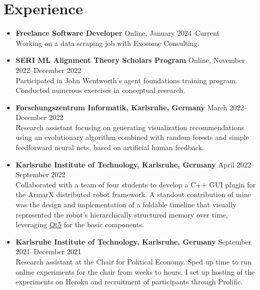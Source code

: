 \documentclass[letterpaper,9pt]{article}
\begin{document}
\section{Experience}
\begin{itemize}
	\item \textbf{Freelance Software Developer} \hfill Online, January 2024--Current \\
        Working on a data scraping job with Exosome Consulting.
	\item \textbf{SERI ML Alignment Theory Scholars Program} \hfill Online, November 2022--December 2022 \\
	      Participated in John Wentworth's agent foundations training program. Conducted numerous exercises in conceptual research.
	\item \textbf{Forschungszentrum Informatik, Karlsruhe, Germany} \hfill March 2022--December 2022 \\
	      Research assistant focusing on generating visualization recommendations using an
	      evolutionary algorithm combined with random forests and simple feedforward neural nets,
	      based on artificial human feedback.
	\item \textbf{Karlsruhe Institute of Technology, Karlsruhe, Germany} \hfill April 2022--September 2022 \\
	      Collaborated with a team of four students to develop a C++ GUI plugin for the
	      ArmarX distributed robot framework. A standout contribution of mine was the
	      design and implementation of a foldable timeline that visually represented the
	      robot's hierarchically structured memory over time,
	      leveraging \href{https://doc.qt.io/qt-5/}{Qt5} for the basic components.
	\item \textbf{Karlsruhe Institute of Technology, Karlsruhe, Germany} \hfill September 2021--December 2021 \\
	      Research assistant at the Chair for Political Economy. Sped up time to run online experiments for the chair from weeks to hours. I set up hosting of the experiments on Heroku and recruitment of participants through Prolific. %
\end{itemize}

\ifdefined\EAVersion
\end{document}
